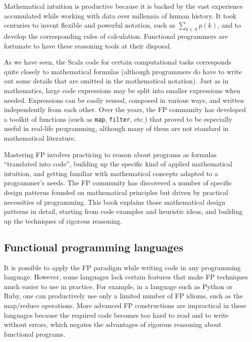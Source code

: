 Mathematical intuition is productive because it is backed by the vast
experience accumulated while working with data over millennia of human
history. It took centuries to invent flexible and powerful notation,
such as $\sum_{k\in S}p(k)$, and to develop the corresponding rules
of calculation. Functional programmers are fortunate to have these
reasoning tools at their disposal.

As we have seen, the Scala code for certain computational tasks corresponds
quite closely to mathematical formulas (although programmers do have
to write out some details that are omitted in the mathematical notation).
Just as in mathematics, large code expressions may be split into smaller
expressions when needed. Expressions can be easily reused, composed
in various ways, and written independently from each other. Over the
years, the FP community has developed a toolkit of functions (such
as \lstinline!map!, \texttt{}\lstinline!filter!, etc.) that proved
to be especially useful in real-life programming, although many of
them are not standard in mathematical literature.

Mastering FP involves practicing to reason about programs as formulas
\textsf{``}translated into code\textsf{''}, building up the specific kind of applied
mathematical intuition, and getting familiar with mathematical concepts
adapted to a programmer\textsf{'}s needs. The FP community has discovered a
number of specific design patterns founded on mathematical principles
but driven by practical necessities of programming. This book explains
those mathematical design patterns in detail, starting from code examples
and heuristic ideas, and building up the techniques of rigorous reasoning.

\subsection{Functional programming languages}

It is possible to apply the FP paradigm while writing code in any
programming language. However, some languages lack certain features
that make FP techniques much easier to use in practice. For example,
in a language such as Python or Ruby, one can productively use only
a limited number of FP idioms, such as the map/reduce operations.
More advanced FP constructions are impractical in these languages
because the required code becomes too hard to read and to write without
errors, which negates the advantages of rigorous reasoning about functional
programs.

